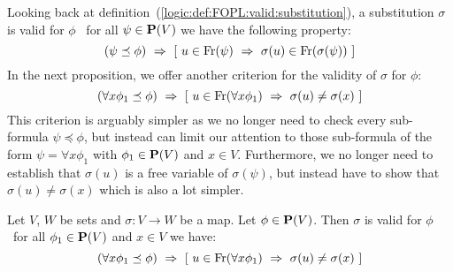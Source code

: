 Looking back at
definition~(\ref{logic:def:FOPL:valid:substitution}), a substitution
$\sigma$ is valid for $\phi$ \ifand\ for all $\psi\in\mbox{${\bf P}(V)$}$ we have
the following property:
    \[
    (\psi\preceq\phi)\ \Rightarrow\ [\
    u\in\free(\psi)\ \Rightarrow\
    \sigma(u)\in\free(\sigma(\psi))\ ]
    \]
In the next proposition, we offer another criterion for the validity
of $\sigma$ for $\phi$:
    \[
    (\forall x\phi_{1}\preceq\phi)\ \Rightarrow\ [\
    u\in\free(\forall x\phi_{1})\ \Rightarrow\
    \sigma(u)\neq\sigma(x)\ ]
    \]
This criterion is arguably simpler as we no longer need to check
every sub-formula $\psi\preceq\phi$, but instead can limit our
attention to those sub-formula of the form $\psi=\forall x\phi_{1}$
with $\phi_{1}\in\mbox{${\bf P}(V)$}$ and $x\in V$. Furthermore, we no longer need
to establish that $\sigma(u)$ is a free variable of $\sigma(\psi)$,
but instead have to show that $\sigma(u)\neq\sigma(x)$ which is also
a lot simpler.
\begin{prop}\label{logic:prop:FOPL:validsub:criterion}
    Let $V$, $W$ be sets and $\sigma:V\to W$ be a map. Let $\phi\in\mbox{${\bf P}(V)$}$. 
    Then $\sigma$ is valid for $\phi$ \ifand\ for all $\phi_{1}\in\mbox{${\bf P}(V)$}$ 
    and $x\in V$ we have:
    \[
        (\forall x\phi_{1}\preceq\phi)\ 
            \Rightarrow\ 
            [\ 
                u\in\free(\forall x\phi_{1})\ 
                    \Rightarrow\
                \sigma(u)\neq\sigma(x)
            \ ]
    \]
\end{prop}
